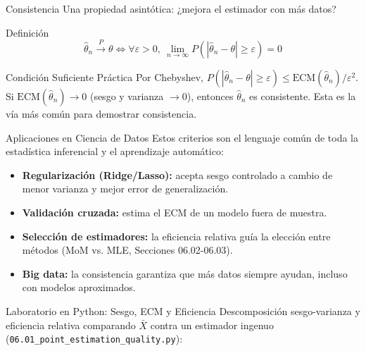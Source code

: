 \documentclass[10pt, aspectratio=169]{beamer}
\begin{document}
\begin{frame}{Consistencia}
  \footnotesize
  Una propiedad asintótica: ¿mejora el estimador con más datos? \pause

  \vspace{0.1cm}
  \begin{block}{Definición}
    $$\hat\theta_n \xrightarrow{P} \theta \iff \forall\varepsilon>0,\ \lim_{n\to\infty} P(|\hat\theta_n-\theta|\ge\varepsilon) = 0$$
  \end{block}

  \vspace{0.1cm}
  \pause
  \begin{alertblock}{Condición Suficiente Práctica}
    Por Chebyshev, $P(|\hat\theta_n-\theta|\ge\varepsilon) \le \text{ECM}(\hat\theta_n)/\varepsilon^2$. Si $\text{ECM}(\hat\theta_n)\to 0$ (sesgo y varianza $\to 0$), entonces $\hat\theta_n$ es consistente. Esta es la vía más común para demostrar consistencia.
  \end{alertblock}
\end{frame}

\begin{frame}{Aplicaciones en Ciencia de Datos}
  \footnotesize
  Estos criterios son el lenguaje común de toda la estadística inferencial y el aprendizaje automático: \pause

  \vspace{0.15cm}
  \begin{itemize}\itemsep=0.12cm
    \item \textbf{Regularización (Ridge/Lasso):} acepta sesgo controlado a cambio de menor varianza y mejor error de generalización. \pause
    \item \textbf{Validación cruzada:} estima el ECM de un modelo fuera de muestra. \pause
    \item \textbf{Selección de estimadores:} la eficiencia relativa guía la elección entre métodos (MoM vs. MLE, Secciones 06.02-06.03). \pause
    \item \textbf{Big data:} la consistencia garantiza que más datos siempre ayudan, incluso con modelos aproximados.
  \end{itemize}
\end{frame}

\begin{frame}[fragile]{Laboratorio en Python: Sesgo, ECM y Eficiencia}
  \scriptsize
  Descomposición sesgo-varianza y eficiencia relativa comparando $\bar X$ contra un estimador ingenuo (\texttt{06.01\_point\_estimation\_quality.py}):
  {
  }
\end{frame}
\end{document}
